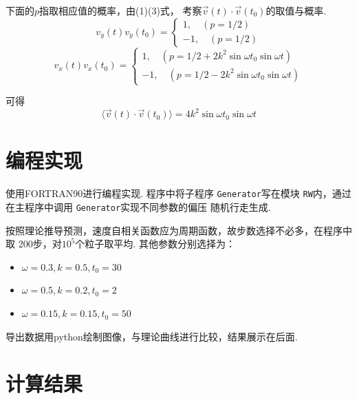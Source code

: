 \documentclass[12pt,a4paper,utf8]{ctexart}
\begin{document}
下面的$p$指取相应值的概率，由(1)(3)式，
考察$ \vec{v}(t) \cdot\vec{v}(t_0)  $的取值与概率.
\begin{equation}
    v_y(t) v_y(t_0) = 
    \begin{cases}
        1, \quad (p=1/2) \\
        -1, \quad(p=1/2)
    \end{cases}
\end{equation}
\begin{equation}
    v_x(t) v_x(t_0) = 
    \begin{cases}
        1, \quad (p=1/2 + 2k^2 \sin \omega t_0\sin \omega t)\\
        -1, \quad (p=1/2 - 2k^2\sin \omega t_0\sin\omega t)
    \end{cases}
\end{equation}

可得
\begin{equation}
    \langle \vec{v}(t) \cdot \vec{v}(t_0)   \rangle = 4k^2 \sin \omega t_0
    \sin \omega t
\end{equation}

\section{编程实现}

使用FORTRAN90进行编程实现. 程序中将子程序 \texttt{Generator}写在模块
\texttt{RW}内，通过在主程序中调用 \texttt{Generator}实现不同参数的偏压
随机行走生成. 

按照理论推导预测，速度自相关函数应为周期函数，故步数选择不必多，在程序中取
200步，对$10^5$个粒子取平均. 其他参数分别选择为：
\begin{itemize}
    \item $\omega = 0.3,k = 0.5, t_0 = 30$
    \item $\omega = 0.5,k = 0.2, t_0 = 2$
    \item $\omega = 0.15,k = 0.15, t_0 = 50$
\end{itemize}

导出数据用python绘制图像，与理论曲线进行比较，结果展示在后面. 

\section{计算结果}
\end{document}
